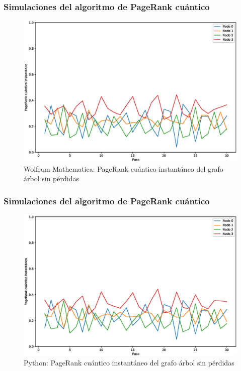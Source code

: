 \documentclass[xetex,mathserif,serif, 8pt]{beamer}
\begin{document}
\begin{frame}
    \frametitle{Simulaciones del algoritmo de PageRank cuántico}

    \begin{figure}[H]
        \centering
        \includegraphics[width=0.9\linewidth]{img/tree-inst-M.eps}
        \caption{Wolfram Mathematica: PageRank cuántico instantáneo del grafo árbol sin pérdidas}
    \end{figure}

\end{frame}

\begin{frame}
    \frametitle{Simulaciones del algoritmo de PageRank cuántico}

    \begin{figure}[H]
        \centering
        \includegraphics[width=0.9\linewidth]{img/tree-inst-lossless.eps}
        \caption{Python: PageRank cuántico instantáneo del grafo árbol sin pérdidas}
    \end{figure}

\end{frame}
\end{document}
